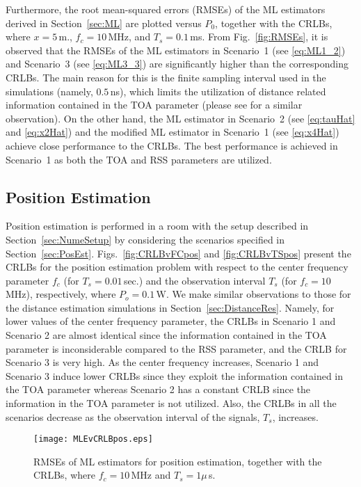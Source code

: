 \documentclass[10pt,twocolumn]{IEEEtran}
\begin{document}
Furthermore, the root mean-squared errors (RMSEs) of the ML estimators derived in Section~\ref{sec:ML} are plotted versus $P_0$, together with the CRLBs, where $x=5\,$m., $f_c=10\,$MHz, and $T_s = 0.1\,$ms. From Fig.~\ref{fig:RMSEs}, it is observed that the RMSEs of the ML estimators in Scenario~1 (see \eqref{eq:ML1_2}) and Scenario~3 (see \eqref{eq:ML3_3}) are significantly higher than the corresponding CRLBs. The main reason for this is the finite sampling interval used in the simulations (namely, $0.5\,$ns), which limits the utilization of  distance related information contained in the TOA parameter (please see \cite{MFK_CRLB} for a similar observation). On the other hand, the ML estimator in Scenario~2 (see \eqref{eq:tauHat} and \eqref{eq:x2Hat}) and the modified ML estimator in Scenario~1 (see \eqref{eq:x4Hat}) achieve close performance to the CRLBs. The best performance is achieved in Scenario~1 as both the TOA and RSS parameters are utilized.


\subsection{Position Estimation}\label{sec:PositionRes}
%

Position estimation is performed in a room with the setup described in Section~\ref{sec:NumeSetup} by considering the scenarios specified in Section~\ref{sec:PosEst}. Figs.~\ref{fig:CRLBvFCpos} and \ref{fig:CRLBvTSpos} present the CRLBs for the position estimation problem with respect to the center frequency parameter $f_c$ (for $T_s=0.01\,$sec.) and the observation interval $T_s$ (for $f_c=10\,$MHz), respectively, where $P_o=0.1\,$W. We make similar observations to those for the distance estimation simulations in Section~\ref{sec:DistanceRes}. Namely, for lower values of the center frequency parameter, the CRLBs in Scenario 1 and Scenario 2 are almost identical since the information contained in the TOA parameter is inconsiderable compared to the RSS parameter, and the CRLB for Scenario 3 is very high. As the center frequency increases, Scenario 1 and Scenario 3 induce lower CRLBs since they exploit the information contained in the TOA parameter whereas Scenario 2 has a constant CRLB since the information in the TOA parameter is not utilized. Also, the CRLBs in all the scenarios decrease as the observation interval of the signals, $T_s$, increases.

\begin{figure}
\centering
\texttt{[image: MLEvCRLBpos.eps]}
\caption{RMSEs of ML estimators for position estimation, together with the CRLBs, where $f_c=10\,$MHz and $T_s=1 \mu\,$s.}
\label{fig:MLEvCRLBpos}
\end{figure}
\end{document}
